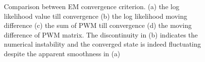 \documentclass{article}
\begin{document}
\begin{figure}[t]
\centering
{}
\caption{Comparison between EM convergence criterion. (a) the log likelihood value till convergence (b) the log likelihood moving difference  (c) the sum of PWM till convergence (d) the moving difference of PWM matrix. The discontinuity in (b) indicates the numerical instability and the converged state is indeed fluctuating despite the apparent smoothness in (a)  }

\end{figure}
\end{document}
